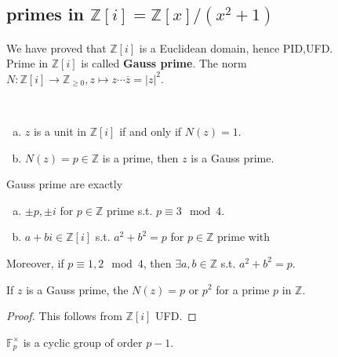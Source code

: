 \subsection{primes in $ \mathbb{Z}[i]=\mathbb{Z}[x]/(x^2+1) $}
We have proved that  $ \mathbb{Z}[i] $ is a Euclidean domain, hence PID,UFD. \\
Prime in  $ \mathbb{Z}[i] $ is called \textbf{Gauss prime}. 
The norm  $ N:\mathbb{Z}[i]\rightarrow \mathbb{Z}_{ \geq 0}, z\mapsto z\cdots\overline{z}=|z|^2 $. \\
\begin{proposition}
    \,
    \begin{enumerate}[(a)]
        \item  $ z  $ is a unit in  $ \mathbb{Z}[i] $ if and only if  $ N(z)=1 $. 
        \item   $ N(z)=p\in \mathbb{Z} $ is a prime, then  $ z  $ is a Gauss prime. 
    \end{enumerate}
\end{proposition}
\begin{theorem}\label{criterion for Gauss prime}
    Gauss prime are exactly
    \begin{enumerate}[(a)]
        \item  $ \pm p,\pm i $ for  $ p\in \mathbb{Z} $ prime s.t.  $ p\equiv 3\mod 4 $.
        \item  $ a+bi\in \mathbb{Z}[i] $ s.t.  $ a^2+b^2=p  $ for  $ p\in \mathbb{Z} $ prime with  $  $  
    \end{enumerate}
    Moreover, if  $ p\equiv 1,2\mod 4 $, then  $ \exists a,b\in \mathbb{Z} $ s.t.  $ a^2+b^2=p $.  
\end{theorem}
\begin{lemma}
    If  $ z  $ is a Gauss prime, the  $ N(z)=p  $ or  $ p^2 $ for a prime  $ p  $ in  $ \mathbb{Z} $.  
\end{lemma}
\begin{proof}
    This follows from  $ \mathbb{Z}[i] $ UFD. 
\end{proof}
\begin{lemma}\label{existence of primitive root}
     $ \mathbb{F}_p^\times $ is a cyclic group of order  $ p-1  $.
\end{lemma}
